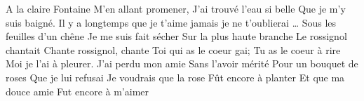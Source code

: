 \beginverse
A la claire Fontaine
M'en allant promener,
J'ai trouvé l'eau si belle
Que je m'y suis baigné.
\endverse
\beginchorus
Il y a longtemps que je t'aime
jamais je ne t'oublierai …
\endchorus
\beginverse
Sous les feuilles d'un chêne
Je me suis fait sécher
Sur la plus haute branche
Le rossignol chantait
\endverse
\beginverse
Chante rossignol, chante
Toi qui as le coeur gai;
Tu as le coeur à rire
Moi je l'ai à pleurer.
\endverse
\beginverse
J'ai perdu mon amie
Sans l'avoir mérité
Pour un bouquet de roses
Que je lui refusai
\endverse
\beginverse
Je voudrais que la rose
Fût encore à planter
Et que ma douce amie
Fut encore à m'aimer
\endverse
\endsong